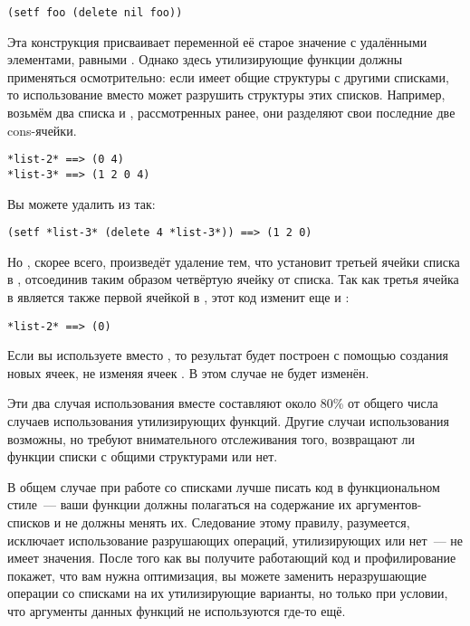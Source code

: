 \begin{lstlisting}
(setf foo (delete nil foo))
\end{lstlisting}

Эта конструкция присваивает переменной  её старое значение с удалёнными
элементами, равными . Однако здесь утилизирующие функции должны применяться
осмотрительно: если  имеет общие структуры с другими списками, то использование
 вместо  может разрушить структуры этих списков. Например,
возьмём два списка  и , рассмотренных ранее, они разделяют свои
последние две cons-ячейки.

\begin{lstlisting}
*list-2* ==> (0 4)
*list-3* ==> (1 2 0 4)
\end{lstlisting}

Вы можете удалить  из  так:

\begin{lstlisting}
(setf *list-3* (delete 4 *list-3*)) ==> (1 2 0)
\end{lstlisting}

Но , скорее всего, произведёт удаление тем, что установит  третьей
ячейки списка в , отсоединив таким образом четвёртую ячейку от
списка. Так как третья ячейка в  является также первой ячейкой в ,
этот код изменит еще и :

\begin{lstlisting}
*list-2* ==> (0)
\end{lstlisting}

Если вы используете  вместо , то результат будет построен с
помощью создания новых ячеек, не изменяя ячеек . В этом случае 
не будет изменён.

Эти два случая использования вместе составляют около 80\% от общего числа случаев
использования утилизирующих функций. Другие случаи использования возможны, но требуют
внимательного отслеживания того, возвращают ли функции списки с общими структурами или нет.

В общем случае при работе со списками лучше писать код в функциональном стиле~--- ваши
функции должны полагаться на содержание их аргументов-списков и не должны менять
их. Следование этому правилу, разумеется, исключает использование разрушающих операций,
утилизирующих или нет~--- не имеет значения. После того как вы получите работающий код и
профилирование покажет, что вам нужна оптимизация, вы можете заменить неразрушающие
операции со списками на их утилизирующие варианты, но только при условии, что аргументы
данных функций не используются где-то ещё.

